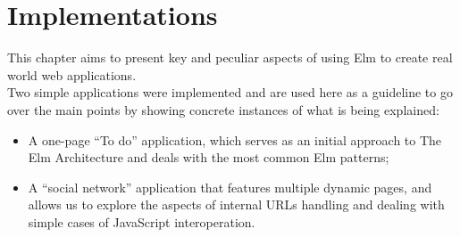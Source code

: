 \chapter{Implementations}

This chapter aims to present key and peculiar aspects of using Elm to create real world web applications.\\

Two simple applications were implemented and are used here as a guideline to go over the main points by showing concrete instances of what is being explained:
\begin{itemize}
    \item A one-page ``To do'' application, which serves as an initial approach to The Elm Architecture and deals with the most common Elm patterns;
    \item A ``social network'' application that features multiple dynamic pages, and allows us to explore the aspects of internal URLs handling and dealing with simple cases of JavaScript interoperation.
\end{itemize}



